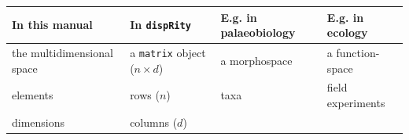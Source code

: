 \documentclass[]{book}
\begin{document}
\begin{longtable}[]{@{}llll@{}}
\toprule
\begin{minipage}[b]{0.22\columnwidth}\raggedright
In this manual\strut
\end{minipage} & \begin{minipage}[b]{0.22\columnwidth}\raggedright
In \texttt{dispRity}\strut
\end{minipage} & \begin{minipage}[b]{0.26\columnwidth}\raggedright
E.g. in palaeobiology\strut
\end{minipage} & \begin{minipage}[b]{0.19\columnwidth}\raggedright
E.g. in ecology\strut
\end{minipage}\tabularnewline
\midrule
\endhead
\begin{minipage}[t]{0.22\columnwidth}\raggedright
the multidimensional space\strut
\end{minipage} & \begin{minipage}[t]{0.22\columnwidth}\raggedright
a \texttt{matrix} object (\(n\times d\))\strut
\end{minipage} & \begin{minipage}[t]{0.26\columnwidth}\raggedright
a morphospace\strut
\end{minipage} & \begin{minipage}[t]{0.19\columnwidth}\raggedright
a function-space\strut
\end{minipage}\tabularnewline
\begin{minipage}[t]{0.22\columnwidth}\raggedright
elements\strut
\end{minipage} & \begin{minipage}[t]{0.22\columnwidth}\raggedright
rows (\(n\))\strut
\end{minipage} & \begin{minipage}[t]{0.26\columnwidth}\raggedright
taxa\strut
\end{minipage} & \begin{minipage}[t]{0.19\columnwidth}\raggedright
field experiments\strut
\end{minipage}\tabularnewline
\begin{minipage}[t]{0.22\columnwidth}\raggedright
dimensions\strut
\end{minipage} & \begin{minipage}[t]{0.22\columnwidth}\raggedright
columns (\(d\))\strut
\end{minipage} & \begin{minipage}[t]{0.26\columnwidth}\raggedright

\end{minipage}
\end{longtable}
\end{document}
